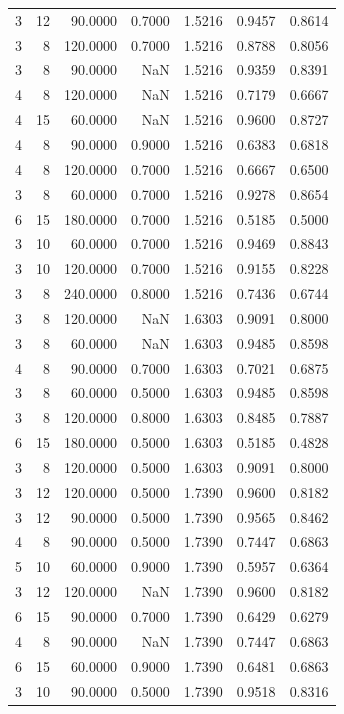 \begin{tabular}{rrrrrrr}
3 & 12 & 90.0000 & 0.7000 & 1.5216 & 0.9457 & 0.8614 \\
3 & 8 & 120.0000 & 0.7000 & 1.5216 & 0.8788 & 0.8056 \\
3 & 8 & 90.0000 & NaN & 1.5216 & 0.9359 & 0.8391 \\
4 & 8 & 120.0000 & NaN & 1.5216 & 0.7179 & 0.6667 \\
4 & 15 & 60.0000 & NaN & 1.5216 & 0.9600 & 0.8727 \\
4 & 8 & 90.0000 & 0.9000 & 1.5216 & 0.6383 & 0.6818 \\
4 & 8 & 120.0000 & 0.7000 & 1.5216 & 0.6667 & 0.6500 \\
3 & 8 & 60.0000 & 0.7000 & 1.5216 & 0.9278 & 0.8654 \\
6 & 15 & 180.0000 & 0.7000 & 1.5216 & 0.5185 & 0.5000 \\
3 & 10 & 60.0000 & 0.7000 & 1.5216 & 0.9469 & 0.8843 \\
3 & 10 & 120.0000 & 0.7000 & 1.5216 & 0.9155 & 0.8228 \\
3 & 8 & 240.0000 & 0.8000 & 1.5216 & 0.7436 & 0.6744 \\
3 & 8 & 120.0000 & NaN & 1.6303 & 0.9091 & 0.8000 \\
3 & 8 & 60.0000 & NaN & 1.6303 & 0.9485 & 0.8598 \\
4 & 8 & 90.0000 & 0.7000 & 1.6303 & 0.7021 & 0.6875 \\
3 & 8 & 60.0000 & 0.5000 & 1.6303 & 0.9485 & 0.8598 \\
3 & 8 & 120.0000 & 0.8000 & 1.6303 & 0.8485 & 0.7887 \\
6 & 15 & 180.0000 & 0.5000 & 1.6303 & 0.5185 & 0.4828 \\
3 & 8 & 120.0000 & 0.5000 & 1.6303 & 0.9091 & 0.8000 \\
3 & 12 & 120.0000 & 0.5000 & 1.7390 & 0.9600 & 0.8182 \\
3 & 12 & 90.0000 & 0.5000 & 1.7390 & 0.9565 & 0.8462 \\
4 & 8 & 90.0000 & 0.5000 & 1.7390 & 0.7447 & 0.6863 \\
5 & 10 & 60.0000 & 0.9000 & 1.7390 & 0.5957 & 0.6364 \\
3 & 12 & 120.0000 & NaN & 1.7390 & 0.9600 & 0.8182 \\
6 & 15 & 90.0000 & 0.7000 & 1.7390 & 0.6429 & 0.6279 \\
4 & 8 & 90.0000 & NaN & 1.7390 & 0.7447 & 0.6863 \\
6 & 15 & 60.0000 & 0.9000 & 1.7390 & 0.6481 & 0.6863 \\
3 & 10 & 90.0000 & 0.5000 & 1.7390 & 0.9518 & 0.8316 \\

\end{tabular}
